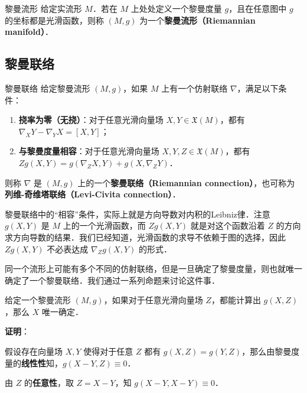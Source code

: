 \begin{definition}{黎曼流形}
给定实流形 $M$．若在 $M$ 上处处定义一个黎曼度量 $g$，且在任意图中 $g$ 的坐标都是光滑函数，则称 $(M, g)$ 为一个\textbf{黎曼流形（Riemannian manifold）}．
\end{definition}





\subsection{黎曼联络}

\begin{definition}{黎曼联络}\label{RieCon_def1}
给定黎曼流形 $(M, g)$，如果 $M$ 上有一个仿射联络 $\nabla$，满足以下条件：
\begin{enumerate}
\item \textbf{挠率为零（无挠）}：对于任意光滑向量场 $X, Y\in\mathfrak{X}(M)$，都有 $\nabla_XY-\nabla_YX={[X, Y]}$；
\item \textbf{与黎曼度量相容}：对于任意光滑向量场 $X, Y, Z\in\mathfrak{X}(M)$，都有 $Zg(X, Y)=g(\nabla_ZX, Y)+g(X, \nabla_ZY)$．
\end{enumerate}
则称 $\nabla$ 是 $(M, g)$ 上的一个\textbf{黎曼联络（Riemannian connection）}，也可称为\textbf{列维-奇维塔联络（Levi-Civita connection）}．
\end{definition}

黎曼联络中的“相容”条件，实际上就是方向导数对内积的Leibniz律．注意 $g(X, Y)$ 是 $M$ 上的一个光滑函数，而 $Zg(X, Y)$ 就是对这个函数沿着 $Z$ 的方向求方向导数的结果．我们已经知道，光滑函数的求导不依赖于图的选择，因此 $Zg(X, Y)$ 不必表达成 $\nabla_Zg(X, Y)$ 的形式．

同一个流形上可能有多个不同的仿射联络，但是一旦确定了黎曼度量，则也就唯一确定了一个黎曼联络．我们通过一系列命题来讨论这件事．







\begin{lemma}{}\label{RieCon_lem1}
给定一个黎曼流形 $(M, g)$，如果对于任意光滑向量场 $Z$，都能计算出 $g(X, Z)$，那么 $X$ 唯一确定．
\end{lemma}

\textbf{证明}：

假设存在向量场 $X, Y$ 使得对于任意 $Z$ 都有 $g(X, Z)=g(Y, Z)$，那么由黎曼度量的\textbf{线性性}知，$g(X-Y, Z)\equiv 0$．

由 $Z$ 的\textbf{任意性}，取 $Z=X-Y$，知 $g(X-Y, X-Y)\equiv 0$．


